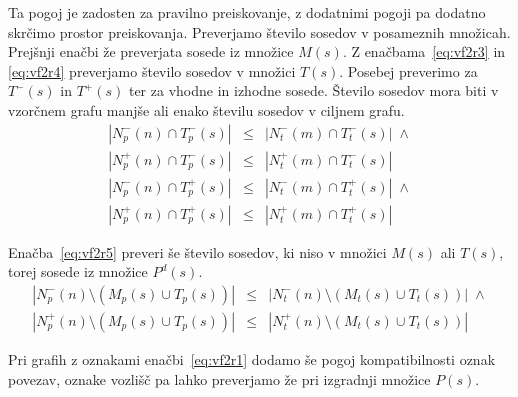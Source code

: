 \documentclass[a4paper, 12pt, ]{book}
\begin{document}
	Ta pogoj je zadosten za pravilno preiskovanje, z dodatnimi pogoji pa dodatno skrčimo prostor preiskovanja. Preverjamo število sosedov v posameznih 
	množicah.  Prejšnji enačbi že preverjata sosede iz množice $M(s)$. Z enačbama~\ref{eq:vf2r3} in \ref{eq:vf2r4} preverjamo število sosedov v
	množici $T(s)$. Posebej preverimo za $T^-(s)$ in $T^+(s)$ ter za vhodne in izhodne sosede. Število sosedov mora biti v vzorčnem grafu manjše ali
	enako številu sosedov v ciljnem grafu.
	\begin{equation}
	\label{eq:vf2r3}
	\begin{array}{rcl}
	|N_p^-(n) \cap T_p^-(s)|   \! & \! \leq \! & \! |N_t^-(m) \cap T_t^-(s)| \; \wedge \\
	|N_p^+(n) \cap T_p^-(s)|  \! & \! \leq \! & \! |N_t^+(m) \cap T_t^-(s)|
	\end{array}
	\end{equation}
	\begin{equation}
	\label{eq:vf2r4}
	\begin{array}{rcl}
	|N_p^-(n) \cap T_p^+(s)|   \! & \! \leq \! & \! |N_t^-(m) \cap T_t^+(s)| \; \wedge \\
	|N_p^+(n) \cap T_p^+(s)|  \! & \! \leq \! & \!|N_t^+(m) \cap T_t^+(s)|
	\end{array}
	\end{equation}
	
	Enačba~\ref{eq:vf2r5} preveri še število sosedov, ki niso v množici $M(s)$ ali $T(s)$, torej sosede iz množice $P^d(s)$.
	\begin{equation}
	\label{eq:vf2r5}
	\begin{array}{rcl}
	|N_p^-(n) \setminus (M_p(s) \cup T_p(s))| \! & \! \leq \! & \! |N_t^-(n) \setminus (M_t(s) \cup T_t(s))| \; \wedge \\
	|N_p^+(n) \setminus (M_p(s) \cup T_p(s))| \! & \! \leq \! & \! |N_t^+(n) \setminus (M_t(s) \cup T_t(s))|
	\end{array}
	\end{equation}
	
	Pri grafih z oznakami enačbi~\ref{eq:vf2r1} dodamo še pogoj kompatibilnosti oznak povezav, oznake vozlišč pa lahko preverjamo že pri izgradnji
	množice $P(s)$.
\end{document}
